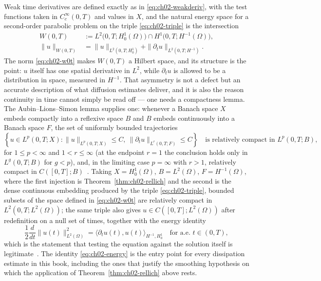 Weak time derivatives are defined exactly as in \eqref{eq:ch02-weakderiv}, with the test functions taken in $C_c^\infty(0,T)$ and values in $X$, and the natural energy space for a second-order parabolic problem on the triple \eqref{eq:ch02-triple} is the intersection
\begin{equation}
  \begin{aligned}
    W(0,T) &:= L^2\big(0,T; H^1_0(\Omega)\big) \cap H^1\big(0,T; H^{-1}(\Omega)\big), \\
    \|u\|_{W(0,T)} &= \|u\|_{L^2(0,T;H^1_0)} + \|\partial_t u\|_{L^2(0,T;H^{-1})}.
  \end{aligned}
  \label{eq:ch02-w0t}
\end{equation}
The norm \eqref{eq:ch02-w0t} makes $W(0,T)$ a Hilbert space, and its structure is the point: $u$ itself has one spatial derivative in $L^2$, while $\partial_t u$ is allowed to be a distribution in space, measured in $H^{-1}$. That asymmetry is not a defect but an accurate description of what diffusion estimates deliver, and it is also the reason continuity in time cannot simply be read off --- one needs a compactness lemma. The Aubin--Lions--Simon lemma supplies one: whenever a Banach space $X$ embeds compactly into a reflexive space $B$ and $B$ embeds continuously into a Banach space $F$, the set of uniformly bounded trajectories
\begin{equation}
  \left\{ u \in L^p(0,T;X) : \|u\|_{L^p(0,T;X)} \le C, \ \|\partial_t u\|_{L^r(0,T;F)} \le C \right\}
  \quad \text{is relatively compact in } L^p(0,T;B),
  \label{eq:ch02-aubinlions}
\end{equation}
for $1 \le p < \infty$ and $1 < r \le \infty$ (at the endpoint $r = 1$ the conclusion holds only in $L^g(0,T;B)$ for $g < p$), and, in the limiting case $p = \infty$ with $r > 1$, relatively compact in $C([0,T];B)$~\cite{evans2010partial}. Taking $X = H^1_0(\Omega)$, $B = L^2(\Omega)$, $F = H^{-1}(\Omega)$, where the first injection is Theorem~\ref{thm:ch02-rellich} and the second is the dense continuous embedding produced by the triple \eqref{eq:ch02-triple}, bounded subsets of the space defined in \eqref{eq:ch02-w0t} are relatively compact in $L^2(0,T;L^2(\Omega))$; the same triple also gives $u \in C([0,T];L^2(\Omega))$ after redefinition on a null set of times, together with the energy identity
\begin{equation}
  \frac{1}{2}\frac{d}{dt}\|u(t)\|_{L^2(\Omega)}^2 = \big\langle \partial_t u(t), u(t) \big\rangle_{H^{-1}, H^1_0}
  \quad \text{for a.e. } t \in (0,T),
  \label{eq:ch02-energy}
\end{equation}
which is the statement that testing the equation against the solution itself is legitimate~\cite{evans2010partial}. The identity \eqref{eq:ch02-energy} is the entry point for every dissipation estimate in this book, including the ones that justify the smoothing hypothesis on which the application of Theorem~\ref{thm:ch02-rellich} above rests.

